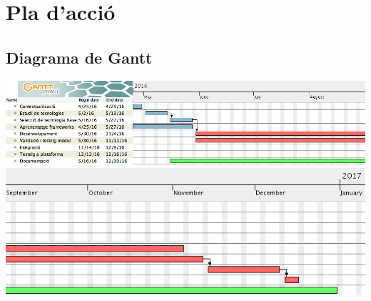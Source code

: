 \section{Pla d'acció}
\subsection{Diagrama de Gantt}
\includegraphics[scale=0.5]{img/ganttHPart1.png}	
\includegraphics[scale=0.5]{img/ganttHPart2.png}	

